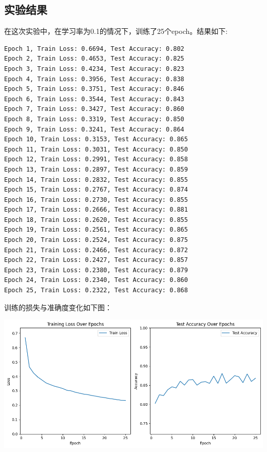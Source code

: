 \documentclass[a4paper,12pt]{article}
\begin{document}
\subsection{实验结果}
在这次实验中，在学习率为0.1的情况下，训练了25个epoch。结果如下:
\begin{lstlisting}
Epoch 1, Train Loss: 0.6694, Test Accuracy: 0.802
Epoch 2, Train Loss: 0.4653, Test Accuracy: 0.825
Epoch 3, Train Loss: 0.4234, Test Accuracy: 0.823
Epoch 4, Train Loss: 0.3956, Test Accuracy: 0.838
Epoch 5, Train Loss: 0.3751, Test Accuracy: 0.846
Epoch 6, Train Loss: 0.3544, Test Accuracy: 0.843
Epoch 7, Train Loss: 0.3427, Test Accuracy: 0.860
Epoch 8, Train Loss: 0.3319, Test Accuracy: 0.850
Epoch 9, Train Loss: 0.3241, Test Accuracy: 0.864
Epoch 10, Train Loss: 0.3153, Test Accuracy: 0.865
Epoch 11, Train Loss: 0.3031, Test Accuracy: 0.850
Epoch 12, Train Loss: 0.2991, Test Accuracy: 0.858
Epoch 13, Train Loss: 0.2897, Test Accuracy: 0.859
Epoch 14, Train Loss: 0.2832, Test Accuracy: 0.855
Epoch 15, Train Loss: 0.2767, Test Accuracy: 0.874
Epoch 16, Train Loss: 0.2730, Test Accuracy: 0.855
Epoch 17, Train Loss: 0.2666, Test Accuracy: 0.881
Epoch 18, Train Loss: 0.2620, Test Accuracy: 0.855
Epoch 19, Train Loss: 0.2561, Test Accuracy: 0.865
Epoch 20, Train Loss: 0.2524, Test Accuracy: 0.875
Epoch 21, Train Loss: 0.2466, Test Accuracy: 0.872
Epoch 22, Train Loss: 0.2427, Test Accuracy: 0.857
Epoch 23, Train Loss: 0.2380, Test Accuracy: 0.879
Epoch 24, Train Loss: 0.2340, Test Accuracy: 0.860
Epoch 25, Train Loss: 0.2322, Test Accuracy: 0.868
\end{lstlisting}

训练的损失与准确度变化如下图：

\centering %
\includegraphics[width=0.8\linewidth]{images/lab1_3_loss.png}
\end{document}
